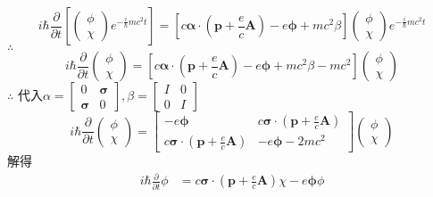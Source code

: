 \documentclass[12pt]{article}
\numberwithin{equation}{section}	 %
\begin{document}
\begin{spacing}{1.5}
\begin{equation}
i\hbar\frac{\partial}{\partial t} \left[ \begin{pmatrix} \phi \\ \chi \end{pmatrix}e^{-\frac{i}{\hbar}mc^{2}t} \right] = \left[ c\bm\alpha\cdot\left(\bm{p} +\frac{e}{c}\bm{A}\right) - e\bm\phi +mc^{2}\beta \right]\begin{pmatrix} \phi \\ \chi \end{pmatrix}e^{-\frac{i}{\hbar}mc^{2}t}
\end{equation}
$\therefore$
\begin{equation}
i\hbar\frac{\partial}{\partial t} \begin{pmatrix} \phi \\ \chi \end{pmatrix} = \left[ c\bm\alpha\cdot\left(\bm{p} +\frac{e}{c}\bm{A}\right) - e\bm\phi +mc^{2}\beta -mc^{2} \right]\begin{pmatrix} \phi \\ \chi \end{pmatrix}
\end{equation}
$\therefore$ 代入$\alpha=\begin{bmatrix} 0 & \bm\sigma \\ \bm\sigma & 0\end{bmatrix}, \beta=\begin{bmatrix} I & 0 \\ 0 & I \end{bmatrix}$
\begin{equation}
i\hbar\frac{\partial}{\partial t} \begin{pmatrix} \phi \\ \chi \end{pmatrix} = \begin{bmatrix}
-e\bm\phi & \displaystyle c\bm\sigma\cdot\left(\bm{p} +\frac{e}{c}\bm{A}\right) \\
\displaystyle c\bm\sigma\cdot\left(\bm{p} +\frac{e}{c}\bm{A}\right) & -e\bm\phi-2mc^{2}
\end{bmatrix} \begin{pmatrix} \phi \\ \chi \end{pmatrix} 
\end{equation}
解得
\begin{align*}
i\hbar\frac{\partial}{\partial t}\phi &= c\bm\sigma\cdot\left(\bm{p} +\frac{e}{c}\bm{A}\right)\chi - e\bm\phi\phi \\

\end{align*}
\end{spacing}
\end{document}
